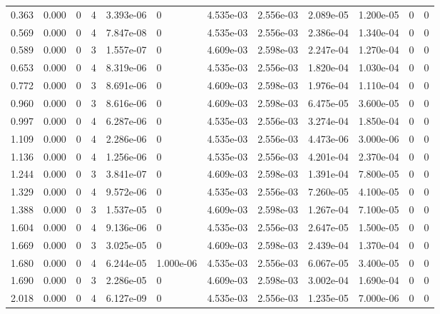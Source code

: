 \documentclass[preview]{standalone}
\begin{document}
{{\begin{tabular}{L{1.2cm}C{1.2cm} C{0.3cm}C{0.5cm} C{1.4cm}C{1.4cm} C{1.4cm}C{1.4cm} C{1.6cm}C{1.6cm} C{1.6cm}C{1.6cm}}
  0.363  &  0.000  & 0     &  4 &  3.393e-06  & 0  &  4.535e-03&   2.556e-03& 2.089e-05 & 1.200e-05   &  0 & 0  \\ 
  0.569  &  0.000  & 0     &  4 &  7.847e-08  & 0  &  4.535e-03&   2.556e-03& 2.386e-04 & 1.340e-04   &  0 & 0  \\ 
  0.589  &  0.000  & 0     &  3 &  1.557e-07  & 0  &  4.609e-03&   2.598e-03& 2.247e-04 & 1.270e-04   &  0 & 0  \\ 
  0.653  &  0.000  & 0     &  4 &  8.319e-06  & 0  &  4.535e-03&   2.556e-03& 1.820e-04 & 1.030e-04   &  0 & 0  \\ 
  0.772  &  0.000  & 0     &  3 &  8.691e-06  & 0  &  4.609e-03&   2.598e-03& 1.976e-04 & 1.110e-04   &  0 & 0  \\ 
  0.960  &  0.000  & 0     &  3 &  8.616e-06  & 0  &  4.609e-03&   2.598e-03& 6.475e-05 & 3.600e-05   &  0 & 0  \\ 
  0.997  &  0.000  & 0     &  4 &  6.287e-06  & 0  &  4.535e-03&   2.556e-03& 3.274e-04 & 1.850e-04   &  0 & 0  \\ 
  1.109  &  0.000  & 0     &  4 &  2.286e-06  & 0  &  4.535e-03&   2.556e-03& 4.473e-06 & 3.000e-06   &  0 & 0  \\ 
  1.136  &  0.000  & 0     &  4 &  1.256e-06  & 0  &  4.535e-03&   2.556e-03& 4.201e-04 & 2.370e-04   &  0 & 0  \\ 
  1.244  &  0.000  & 0     &  3 &  3.841e-07  & 0  &  4.609e-03&   2.598e-03& 1.391e-04 & 7.800e-05   &  0 & 0  \\ 
  1.329  &  0.000  & 0     &  4 &  9.572e-06  & 0  &  4.535e-03&   2.556e-03& 7.260e-05 & 4.100e-05   &  0 & 0  \\ 
  1.388  &  0.000  & 0     &  3 &  1.537e-05  & 0  &  4.609e-03&   2.598e-03& 1.267e-04 & 7.100e-05   &  0 & 0  \\ 
  1.604  &  0.000  & 0     &  4 &  9.136e-06  & 0  &  4.535e-03&   2.556e-03& 2.647e-05 & 1.500e-05   &  0 & 0  \\ 
  1.669  &  0.000  & 0     &  3 &  3.025e-05  & 0  &  4.609e-03&   2.598e-03& 2.439e-04 & 1.370e-04   &  0 & 0  \\ 
  1.680  &  0.000  & 0     &  4 &  6.244e-05  & 1.000e-06  &  4.535e-03&   2.556e-03& 6.067e-05 & 3.400e-05   &  0 & 0  \\ 
  1.690  &  0.000  & 0     &  3 &  2.286e-05  & 0  &  4.609e-03&   2.598e-03& 3.002e-04 & 1.690e-04   &  0 & 0  \\ 
  2.018  &  0.000  & 0     &  4 &  6.127e-09  & 0  &  4.535e-03&   2.556e-03& 1.235e-05 & 7.000e-06   &  0 & 0  \\ 

\end{tabular}}}
\end{document}
